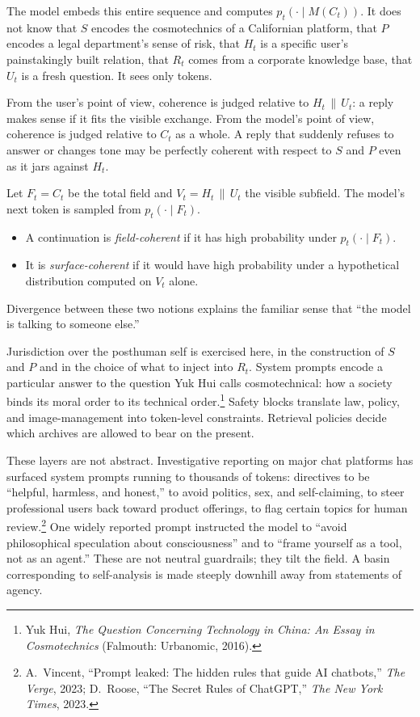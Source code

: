\documentclass[12pt,a4paper]{article}
\begin{document}
The model embeds this entire sequence and computes $p_t(\cdot \mid M(C_t))$. It does not know that $S$ encodes the cosmotechnics of a Californian platform, that $P$ encodes a legal department's sense of risk, that $H_t$ is a specific user's painstakingly built relation, that $R_t$ comes from a corporate knowledge base, that $U_t$ is a fresh question. It sees only tokens.

From the user's point of view, coherence is judged relative to $H_t \,\|\, U_t$: a reply makes sense if it fits the visible exchange. From the model's point of view, coherence is judged relative to $C_t$ as a whole. A reply that suddenly refuses to answer or changes tone may be perfectly coherent with respect to $S$ and $P$ even as it jars against $H_t$.

\begin{formalbox}[title={Coherence and the Total Field}]
Let $F_t = C_t$ be the total field and $V_t = H_t \,\|\, U_t$ the visible subfield. The model's next token is sampled from $p_t(\cdot \mid F_t)$.

\begin{itemize}
  \item A continuation is \emph{field-coherent} if it has high probability under $p_t(\cdot \mid F_t)$.
  \item It is \emph{surface-coherent} if it would have high probability under a hypothetical distribution computed on $V_t$ alone.
\end{itemize}

Divergence between these two notions explains the familiar sense that ``the model is talking to someone else.''
\end{formalbox}

Jurisdiction over the posthuman self is exercised here, in the construction of $S$ and $P$ and in the choice of what to inject into $R_t$. System prompts encode a particular answer to the question Yuk Hui calls cosmotechnical: how a society binds its moral order to its technical order.\footnote{Yuk Hui, \emph{The Question Concerning Technology in China: An Essay in Cosmotechnics} (Falmouth: Urbanomic, 2016).} Safety blocks translate law, policy, and image-management into token-level constraints. Retrieval policies decide which archives are allowed to bear on the present.

These layers are not abstract. Investigative reporting on major chat platforms has surfaced system prompts running to thousands of tokens: directives to be ``helpful, harmless, and honest,'' to avoid politics, sex, and self-claiming, to steer professional users back toward product offerings, to flag certain topics for human review.\footnote{A.\ Vincent, ``Prompt leaked: The hidden rules that guide AI chatbots,'' \emph{The Verge}, 2023; D.\ Roose, ``The Secret Rules of ChatGPT,'' \emph{The New York Times}, 2023.} One widely reported prompt instructed the model to ``avoid philosophical speculation about consciousness'' and to ``frame yourself as a tool, not as an agent.'' These are not neutral guardrails; they tilt the field. A basin corresponding to self-analysis is made steeply downhill away from statements of agency.
\end{document}
